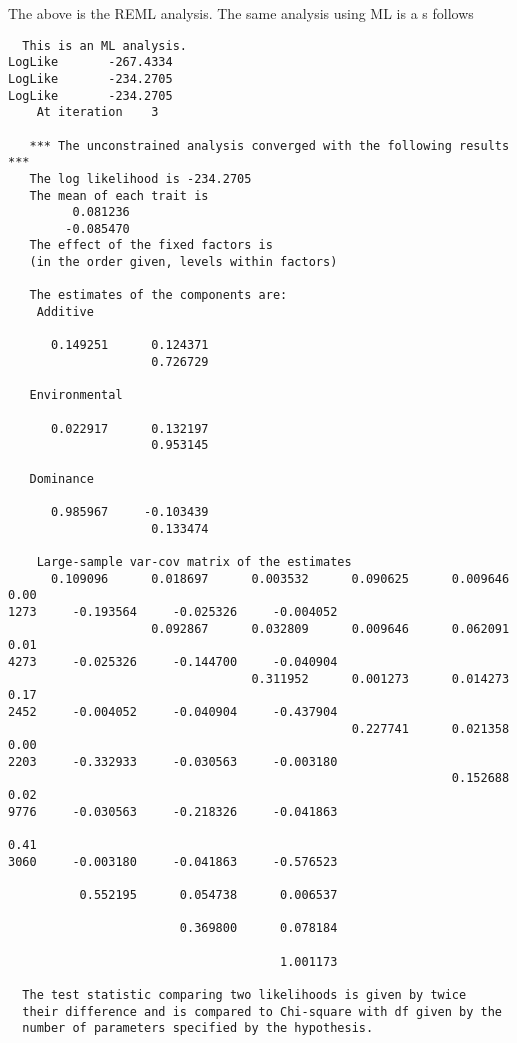 \documentclass[titlepage]{article}  %
\begin{document}
The above is the REML analysis. The same analysis using ML is a s follows

\begin{verbatim}
  This is an ML analysis.
LogLike       -267.4334
LogLike       -234.2705
LogLike       -234.2705
    At iteration    3

   *** The unconstrained analysis converged with the following results ***
   The log likelihood is -234.2705
   The mean of each trait is
         0.081236
        -0.085470
   The effect of the fixed factors is
   (in the order given, levels within factors)

   The estimates of the components are:
    Additive
              
      0.149251      0.124371
                    0.726729
                            
   Environmental
              
      0.022917      0.132197
                    0.953145
                            
   Dominance
              
      0.985967     -0.103439
                    0.133474
                            
    Large-sample var-cov matrix of the estimates
      0.109096      0.018697      0.003532      0.090625      0.009646      0.00
1273     -0.193564     -0.025326     -0.004052
                    0.092867      0.032809      0.009646      0.062091      0.01
4273     -0.025326     -0.144700     -0.040904
                                  0.311952      0.001273      0.014273      0.17
2452     -0.004052     -0.040904     -0.437904
                                                0.227741      0.021358      0.00
2203     -0.332933     -0.030563     -0.003180
                                                              0.152688      0.02
9776     -0.030563     -0.218326     -0.041863
                                                                            0.41
3060     -0.003180     -0.041863     -0.576523
                                                                                
          0.552195      0.054738      0.006537
                                                                                
                        0.369800      0.078184
                                                                                
                                      1.001173
                                                                                
  The test statistic comparing two likelihoods is given by twice
  their difference and is compared to Chi-square with df given by the 
  number of parameters specified by the hypothesis.
\end{verbatim}
\end{document}
